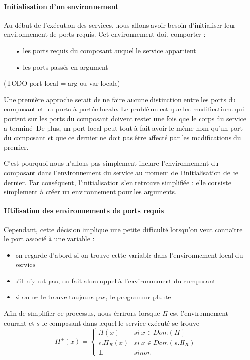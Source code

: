 \documentclass[11pt,a4paper,fleqn]{report}
\begin{document}
\paragraph{Initialisation d'un environnement}
Au début de l'exécution des services, nous allons avoir besoin d'initialiser leur environnement de ports requis. Cet environnement doit comporter :
\begin{itemize}
\item[•]les ports requis du composant auquel le service appartient
\item[•]les ports passés en argument
\end{itemize}

(TODO port local = arg ou var locale)

Une première approche serait de ne faire aucune distinction entre les ports du composant et les ports à portée locale. Le problème est que les modifications qui portent sur les ports du composant doivent rester une fois que le corps du service a terminé. De plus, un port local peut tout-à-fait avoir le même nom qu'un port du composant et que ce dernier ne doit pas être affecté par les modifications du premier.

C'est pourquoi nous n'allons pas simplement inclure l'environnement du composant dans l'environnement du service au moment de l'initialisation de ce dernier. Par conséquent, l'initialisation s'en retrouve simplifiée : elle consiste simplement à créer un environnement pour les arguments.

\paragraph{Utilisation des environnements de ports requis}
Cependant, cette décision implique une petite difficulté lorsqu'on veut connaître le port associé à une variable : 
\begin{itemize}
\item on regarde d'abord si on trouve cette variable dans l'environnement local du service
\item s'il n'y est pas, on fait alors appel à l'environnement du composant
\item si on ne le trouve toujours pas, le programme plante
\end{itemize}

Afin de simplifier ce processus, nous écrirons lorsque $\Pi$ est l'environnement courant et $s$ le composant dans lequel le service exécuté se trouve,
\[\Pi^+(x) = \begin{cases}
\Pi(x) & si ~ x\in Dom(\Pi)\\
s.\Pi_R(x) & si~x\in Dom(s.\Pi_R)\\
\perp & sinon
\end{cases}\]
\end{document}
